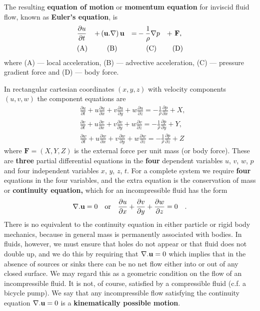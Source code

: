 \documentclass[twoside,a4paper,11pt]{report}
\begin{document}
The resulting \textbf{equation of motion} or \textbf{momentum equation} for 
inviscid fluid flow, known as \textbf{Euler's equation}, is
\begin{alignat*}{4}
& \frac{\partial u}{\partial t} & +
& \left( {{{\bf u}}. \nabla } \right){{\bf u}}  & =
& -\frac{1}{\rho }\nabla p & + &\  \textbf{F} , \\
&\hbox{(A)}&
&\ \ \ \hbox{(B) }&
&\ \ \ \ \hbox{(C)}&
&\hbox{(D)}\end{alignat*}
where (A) --- local acceleration, (B) --- advective acceleration, (C) ---
pressure gradient force and (D) --- body force.

In rectangular cartesian coordinates $(x,y,z)$ with velocity components 
$(u,v,w)$ the component equations are 
\begin{align*}
&\frac{\partial u}{\partial t}+u\frac{\partial u}{\partial 
x}+v\frac{\partial u}{\partial y}+w\frac{\partial 
u}{\partial z}=-\frac{1}{\rho }\frac{\partial p}{\partial 
x}+X, \\
& \frac{\partial v}{\partial t}+u\frac{\partial v}{\partial 
x}+v\frac{\partial v}{\partial y}+w\frac{\partial 
v}{\partial z}=-\frac{1}{\rho }\frac{\partial p}{\partial 
y}+Y, \\
& \frac{\partial w}{\partial t}+u\frac{\partial w}{\partial 
x}+v\frac{\partial w}{\partial y}+w\frac{\partial 
w}{\partial z}=-\frac{1}{\rho }\frac{\partial p}{\partial 
z}+Z
\end{align*}
where $ \textbf{F} = (X,Y,Z)$ is the external force per unit mass (or body 
force). These are \textbf{three} partial differential equations in the 
\textbf{four} dependent variables $u$, $v$, $w$, $p$ and four independent variables 
$x$, $y$, $z$, $t$. For a complete system we require \textbf{four} equations in the 
four variables, and the extra equation is the conservation of mass or 
\textbf{continuity equation,} which for an incompressible fluid has the form
\[
\nabla . {\bf u}=0\quad\hbox{or} \quad \frac{\partial 
u}{\partial x}+\frac{\partial v}{\partial y}+\frac{\partial 
w}{\partial z}=0\quad .
\]
There is no equivalent to the continuity equation in either particle or 
rigid body mechanics, because in general mass is permanently associated with 
bodies. In fluids, however, we must ensure that holes do not appear or that 
fluid does not double up, and we do this by requiring that $\nabla . 
{\bf u}=0$ which implies that in the absence of sources or sinks there can be no 
net flow either into or out of any closed surface. We may regard this as a 
geometric condition on the flow of an incompressible fluid. It is not, of 
course, satisfied by a compressible fluid (c.f. a bicycle pump). We say that 
any incompressible flow satisfying the continuity equation $\nabla . 
{{\bf u}}=0$ is a \textbf{kinematically possible motion}. 
\end{document}
